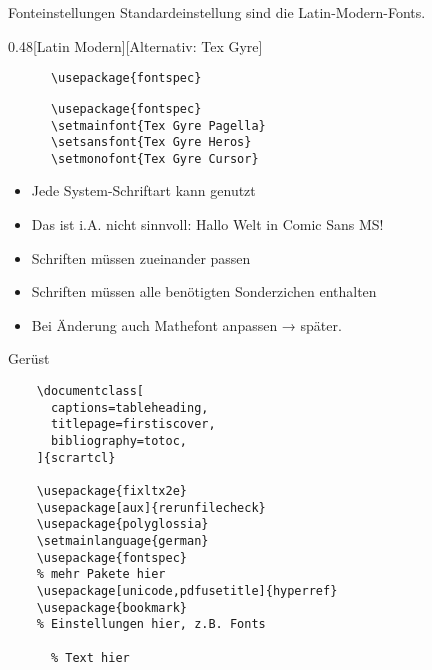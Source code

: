 \begin{frame}[fragile]{Fonteinstellungen}
  Standardeinstellung sind die Latin-Modern-Fonts.
  \vspace{1em}
  \begin{CodeExample}{0.48}[Latin Modern][Alternativ: Tex Gyre]
    \begin{lstlisting}
      \usepackage{fontspec}
    \end{lstlisting}
  \CodeResult
    \begin{lstlisting}
      \usepackage{fontspec}
      \setmainfont{Tex Gyre Pagella}
      \setsansfont{Tex Gyre Heros}
      \setmonofont{Tex Gyre Cursor}
    \end{lstlisting}
  \end{CodeExample}
  \begin{itemize}
    \item Jede System-Schriftart kann genutzt
    \item \alert{Das ist i.A. nicht sinnvoll:  Hallo Welt in Comic Sans MS!}
    \item Schriften müssen zueinander passen
    \item Schriften müssen alle benötigten Sonderzichen enthalten
    \item Bei Änderung auch Mathefont anpassen → später.
  \end{itemize}
\end{frame}

\begin{frame}[fragile]{Gerüst}
  \begin{lstlisting}
    \documentclass[
      captions=tableheading,
      titlepage=firstiscover,
      bibliography=totoc,
    ]{scrartcl}

    \usepackage{fixltx2e}
    \usepackage[aux]{rerunfilecheck}
    \usepackage{polyglossia}
    \setmainlanguage{german}
    \usepackage{fontspec}
    % mehr Pakete hier
    \usepackage[unicode,pdfusetitle]{hyperref}
    \usepackage{bookmark}
    % Einstellungen hier, z.B. Fonts
    
      % Text hier
    
  \end{lstlisting}
\end{frame}

